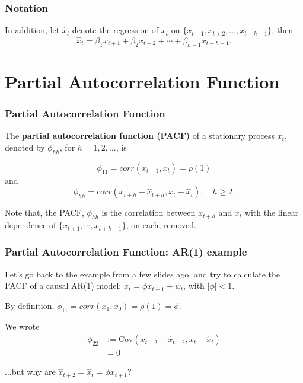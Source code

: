 \documentclass[%
xcolor=pdftex]{beamer}
\begin{document}
\begin{frame}
\frametitle{Notation}

In addition, let $\hat{x}_t$ denote the regression of
$x_t$ on $\{x_{t+1},x_{t+2},\ldots,x_{t+h-1}\}$, then
\begin{equation}
\hat{x}_t = \beta_1 x_{t+1} + \beta_2 x_{t+2} + \cdots + \beta_{h-1} x_{t+h-1}.
\end{equation}

\end{frame}

\section{Partial Autocorrelation Function}
\frame{\tableofcontents[currentsection]}

\begin{frame}
\frametitle{Partial Autocorrelation Function}

The {\bf partial autocorrelation
function (PACF)} of a stationary process $x_t$, denoted by
$\phi_{hh}$, for $h=1,2,\ldots$, is

\begin{equation}
\phi_{11} = corr(x_{t+1},x_t) = \rho(1)
\end{equation}
and
\begin{equation}
\phi_{hh}=corr(x_{t+h}-\hat{x}_{t+h}, x_t-\hat{x}_t), \quad h\ge 2.
\end{equation}

Note that, the PACF, $\phi_{hh}$ is the correlation between
$x_{t+h}$ and $x_{t}$ with the linear dependence of
$\{x_{t+1},\cdots,x_{t+h-1}\}$, on each, removed.

\end{frame}

\begin{frame}


\frametitle{Partial Autocorrelation Function: AR(1) example}

Let's go back to the example from a few slides ago, and try to calculate the PACF of a causal AR(1) model: $x_t=\phi
x_{t-1}+w_t$, with $|\phi|<1$.
\newline

By definition, $\phi_{11}=corr(x_1,x_0)=\rho(1)=\phi$. 
\newline

We wrote
\begin{align*}
\phi_{22} &:= \text{Cov}(x_{t+2} - \hat{x}_{t+2},x_{t} - \hat{x}_t) \\
&= 0
\end{align*}

...but why are $\hat{x}_{t+2} = \hat{x}_t = \phi x_{t+1}$? 

\end{frame}
\end{document}

